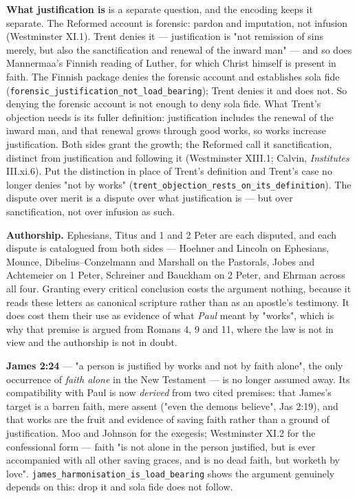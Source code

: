 \documentclass[11pt]{article}
\begin{document}
\textbf{What justification is} is a separate question, and the encoding keeps it separate. The Reformed account is forensic: pardon and imputation, not infusion (Westminster XI.1). Trent denies it — justification is "not remission of sins merely, but also the sanctification and renewal of the inward man" — and so does Mannermaa's Finnish reading of Luther, for which Christ himself is present in faith. The Finnish package denies the forensic account and establishes sola fide (\texttt{forensic\_\allowbreak{}justification\_\allowbreak{}not\_\allowbreak{}load\_\allowbreak{}bearing}); Trent denies it and does not. So denying the forensic account is not enough to deny sola fide. What Trent's objection needs is its fuller definition: justification includes the renewal of the inward man, and that renewal grows through good works, so works increase justification. Both sides grant the growth; the Reformed call it sanctification, distinct from justification and following it (Westminster XIII.1; Calvin, \emph{Institutes} III.xi.6). Put the distinction in place of Trent's definition and Trent's case no longer denies "not by works" (\texttt{trent\_\allowbreak{}objection\_\allowbreak{}rests\_\allowbreak{}on\_\allowbreak{}its\_\allowbreak{}definition}). The dispute over merit is a dispute over what justification is — but over sanctification, not over infusion as such.

\textbf{Authorship.} Ephesians, Titus and 1 and 2 Peter are each disputed, and each dispute is catalogued from both sides — Hoehner and Lincoln on Ephesians, Mounce, Dibelius–Conzelmann and Marshall on the Pastorals, Jobes and Achtemeier on 1 Peter, Schreiner and Bauckham on 2 Peter, and Ehrman across all four. Granting every critical conclusion costs the argument nothing, because it reads these letters as canonical scripture rather than as an apostle's testimony. It does cost them their use as evidence of what \emph{Paul} meant by "works", which is why that premise is argued from Romans 4, 9 and 11, where the law is not in view and the authorship is not in doubt.

\textbf{James 2:24} — "a person is justified by works and not by faith alone", the only occurrence of \emph{faith alone} in the New Testament — is no longer assumed away. Its compatibility with Paul is now \emph{derived} from two cited premises: that James's target is a barren faith, mere assent ("even the demons believe", Jas 2:19), and that works are the fruit and evidence of saving faith rather than a ground of justification. Moo and Johnson for the exegesis; Westminster XI.2 for the confessional form — faith "is not alone in the person justified, but is ever accompanied with all other saving graces, and is no dead faith, but worketh by love". \texttt{james\_\allowbreak{}harmonisation\_\allowbreak{}is\_\allowbreak{}load\_\allowbreak{}bearing} shows the argument genuinely depends on this: drop it and sola fide does not follow.
\end{document}
